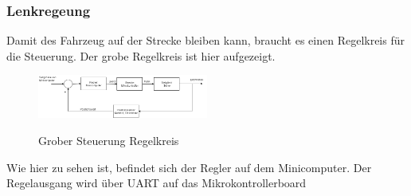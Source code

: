 \subsubsection{Lenkregeung}
Damit des Fahrzeug auf der Strecke bleiben kann, braucht es einen Regelkreis für die Steuerung. Der grobe Regelkreis ist hier aufgezeigt.
\begin{figure}[H]
	\centering
	\includegraphics[width=0.5\textwidth]{03_Loesungskonzept/pictures/Lenk_Regelung.png}
	\label{fig:Regelung_Lenken}
	\caption{Grober Steuerung Regelkreis }
\end{figure}
Wie hier zu sehen ist, befindet sich der Regler auf dem Minicomputer. Der Regelausgang wird über UART auf das Mikrokontrollerboard 
